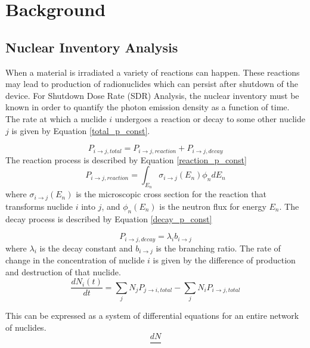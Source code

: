 \section{Background}


\subsection{Nuclear Inventory Analysis}
When a material is irradiated a variety of reactions can happen. These 
reactions may lead to production of radionuclides which can persist
after shutdown of the device. For Shutdown Dose Rate (SDR) Analysis, 
the nuclear inventory must be known
in order to quantify the photon emission density as a function of time.
The rate at which a nuclide $i$ undergoes a reaction or decay to some 
other nuclide $j$ is given by Equation \ref{total_p_const}.

\begin{equation}\label{total_p_const}
  P_{i \rightarrow j, total} = P_{i \rightarrow j, reaction } +
  P_{i \rightarrow j, decay}
\end{equation}
The reaction process is described by Equation \ref{reaction_p_const}
\begin{equation}\label{reaction_p_const}
  P_{i \rightarrow j, reaction } =
  \int_{E_{n}} \sigma_{i \rightarrow j}(E_{n})
  \phi_{n}dE_{n}
\end{equation}
where $\sigma_{i \rightarrow j}(E_{n})$ is the microscopic cross
section for the reaction that transforms nuclide $i$ into $j$, and
 $\phi_{n}(E_{n})$ is the neutron flux for energy $E_{n}$.
The decay process is described by Equation
\ref{decay_p_const}

\begin{equation}\label{decay_p_const}
  P_{i \rightarrow j, decay} = \lambda_{i} b_{i \rightarrow j}
\end{equation}
where $\lambda_{i}$ is the decay constant and $b_{i \rightarrow j}$ is
the branching ratio.
The rate of change in the concentration of nuclide $i$ is given by the 
difference of production and destruction of that nuclide. 
\begin{equation}\label{rate_change_i}
  \frac{dN_{i}(t)}{dt} = \sum_{j} N_{j}P_{j \rightarrow i, total}
  - \sum_{j} N_{i}P_{i \rightarrow j, total}
\end{equation}

This can be expressed as a system of differential equations for an 
entire network of nuclides. 
\begin{equation}
  \frac{dN}{}
\end{equation}


